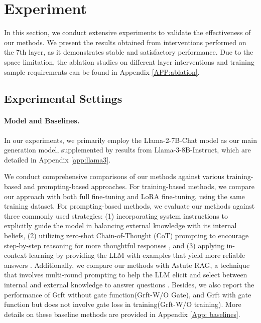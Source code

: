 \section{Experiment}\label{sec:experiment}


In this section, we conduct extensive experiments to validate the effectiveness of our methods. We present the results obtained from interventions performed on the 7th layer, as it demonstrates stable and satisfactory performance. Due to the space limitation, the ablation studies on different layer interventions and training sample requirements can be found in Appendix \ref{APP:ablation}.   



\subsection{Experimental Settings}
\label{sec:ex_setting}
\paragraph{Model and Baselines.}
In our experiments, we primarily employ the Llama-2-7B-Chat model as our main generation model, supplemented by results from Llama-3-8B-Instruct, which are detailed in Appendix \ref{app:llama3}. 

We conduct comprehensive comparisons of our methods against various training-based and prompting-based approaches. For training-based methods, we compare our approach with both full fine-tuning and LoRA fine-tuning, using the same training dataset. For prompting-based methods, we evaluate our methods against three commonly used strategies: (1) incorporating system instructions to explicitly guide the model in balancing external knowledge with its internal beliefs, (2) utilizing zero-shot Chain-of-Thought (CoT) prompting to encourage step-by-step reasoning for more thoughtful responses \cite{wei2022chain}, and (3) applying in-context learning by providing the LLM with examples that yield more reliable answers \cite{}. Additionally, we compare our methods with Astute RAG, a technique that involves multi-round prompting to help the LLM elicit and select between internal and external knowledge to answer questions \cite{wang2024astute}. Besides, we also report the performance of Grft without gate function(Grft-W/O Gate), and Grft with gate function but does not involve gate loss in training(Grft-W/O training). More details on these baseline methods are provided in Appendix \ref{App: baselines}.


